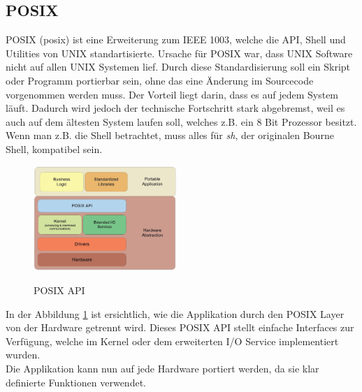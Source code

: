 \subsection{POSIX}
POSIX (\acrlong{posix}) ist eine Erweiterung zum IEEE 1003, welche die API, Shell und Utilities von UNIX standartisierte.
Ursache für POSIX war, dass UNIX Software nicht auf allen UNIX Systemen lief.
Durch diese Standardisierung soll ein Skript oder Programm portierbar sein, ohne das eine Änderung im Sourcecode vorgenommen werden muss. Der Vorteil liegt darin, dass es auf jedem System läuft. Dadurch wird jedoch der technische Fortschritt stark abgebremst, weil es auch auf dem ältesten System laufen soll, welches z.B. ein 8 Bit Prozessor besitzt. Wenn man z.B. die Shell betrachtet, muss alles für \textit{sh}, der originalen Bourne Shell, kompatibel sein. \cite{shotts2012linux}



\begin{figure}[ht]
  \begin{center}
  \includegraphics[width=0.48\textwidth]{pic/20_pixhawk/POSIX_RTOS_Model.jpg}
  \caption{POSIX API}
  \cite{posix_pic}
  \label{fig:posix}
  \end{center}
\end{figure}


\noindent In der Abbildung \ref{fig:posix} ist ersichtlich, wie die Applikation durch den POSIX Layer von der Hardware getrennt wird. Dieses POSIX API stellt einfache Interfaces zur Verfügung, welche im Kernel oder dem erweiterten I/O Service implementiert wurden. \\
Die Applikation kann nun auf jede Hardware portiert werden, da sie klar definierte Funktionen verwendet.

\clearpage